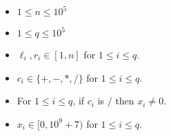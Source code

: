 \begin{itemize}
\tightlist
\item $1 \le n \le 10^5$
\item $1 \le q \le 10^5$
\item $\ell_i, r_i \in [1, n]$ for $1\le i \le q$.
\item $c_i \in\{+,-,*,/\}$ for $1\le i \le q$.
\item For $1\le i \le q$, if $c_i$ is $/$ then $x_i \neq 0$.
\item $x_i \in [0, 10^9+7)$ for $1\le i \le q$.
\end{itemize}
\newpage

